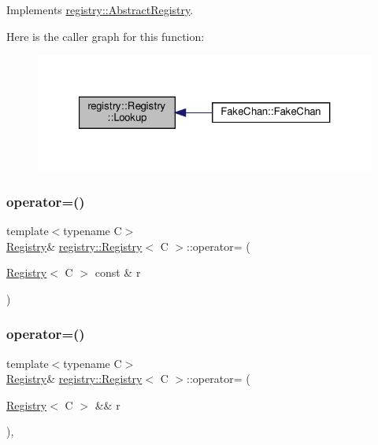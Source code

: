 Implements \hyperlink{classregistry_1_1AbstractRegistry_a978d5b55eeea945b0cc441e28a084518}{registry\+::\+Abstract\+Registry}.

Here is the caller graph for this function\+:\nopagebreak
\begin{figure}[H]
\begin{center}
\leavevmode
\includegraphics[width=321pt]{classregistry_1_1Registry_a15423d8f77a60eb8de72b851d2d34318_icgraph}
\end{center}
\end{figure}
\mbox{\label{classregistry_1_1Registry_a64553c5b4bc597a69876b614fe1eeab3}} 
\subsubsection{\texorpdfstring{operator=()}{operator=()}\hspace{0.1cm}{\footnotesize\ttfamily [1/2]}}
{\footnotesize\ttfamily template$<$typename C$>$ \\
\hyperlink{classregistry_1_1Registry}{Registry}\& \hyperlink{classregistry_1_1Registry}{registry\+::\+Registry}$<$ C $>$\+::operator= (\begin{DoxyParamCaption}\item[{\hyperlink{classregistry_1_1Registry}{Registry}$<$ C $>$ const \&}]{r }\end{DoxyParamCaption})\hspace{0.3cm}{\ttfamily [delete]}}

\mbox{\label{classregistry_1_1Registry_a3faca0c879dc001f097ba069c13cf6a1}} 
\subsubsection{\texorpdfstring{operator=()}{operator=()}\hspace{0.1cm}{\footnotesize\ttfamily [2/2]}}
{\footnotesize\ttfamily template$<$typename C$>$ \\
\hyperlink{classregistry_1_1Registry}{Registry}\& \hyperlink{classregistry_1_1Registry}{registry\+::\+Registry}$<$ C $>$\+::operator= (\begin{DoxyParamCaption}\item[{\hyperlink{classregistry_1_1Registry}{Registry}$<$ C $>$ \&\&}]{r }\end{DoxyParamCaption})\hspace{0.3cm}{\ttfamily [default]}, {\ttfamily [noexcept]}}

